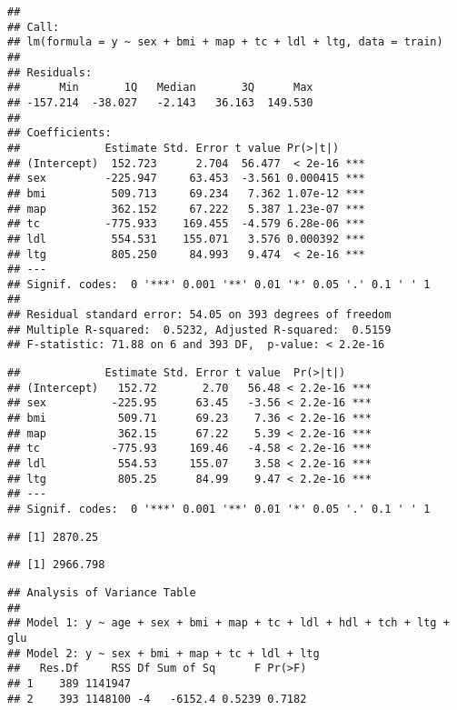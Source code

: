 \documentclass[
]{article}
\begin{document}
\begin{verbatim}
## 
## Call:
## lm(formula = y ~ sex + bmi + map + tc + ldl + ltg, data = train)
## 
## Residuals:
##      Min       1Q   Median       3Q      Max 
## -157.214  -38.027   -2.143   36.163  149.530 
## 
## Coefficients:
##             Estimate Std. Error t value Pr(>|t|)    
## (Intercept)  152.723      2.704  56.477  < 2e-16 ***
## sex         -225.947     63.453  -3.561 0.000415 ***
## bmi          509.713     69.234   7.362 1.07e-12 ***
## map          362.152     67.222   5.387 1.23e-07 ***
## tc          -775.933    169.455  -4.579 6.28e-06 ***
## ldl          554.531    155.071   3.576 0.000392 ***
## ltg          805.250     84.993   9.474  < 2e-16 ***
## ---
## Signif. codes:  0 '***' 0.001 '**' 0.01 '*' 0.05 '.' 0.1 ' ' 1
## 
## Residual standard error: 54.05 on 393 degrees of freedom
## Multiple R-squared:  0.5232, Adjusted R-squared:  0.5159 
## F-statistic: 71.88 on 6 and 393 DF,  p-value: < 2.2e-16
\end{verbatim}

\begin{verbatim}
##             Estimate Std. Error t value  Pr(>|t|)    
## (Intercept)   152.72       2.70   56.48 < 2.2e-16 ***
## sex          -225.95      63.45   -3.56 < 2.2e-16 ***
## bmi           509.71      69.23    7.36 < 2.2e-16 ***
## map           362.15      67.22    5.39 < 2.2e-16 ***
## tc           -775.93     169.46   -4.58 < 2.2e-16 ***
## ldl           554.53     155.07    3.58 < 2.2e-16 ***
## ltg           805.25      84.99    9.47 < 2.2e-16 ***
## ---
## Signif. codes:  0 '***' 0.001 '**' 0.01 '*' 0.05 '.' 0.1 ' ' 1
\end{verbatim}

\begin{verbatim}
## [1] 2870.25
\end{verbatim}

\begin{verbatim}
## [1] 2966.798
\end{verbatim}

\begin{verbatim}
## Analysis of Variance Table
## 
## Model 1: y ~ age + sex + bmi + map + tc + ldl + hdl + tch + ltg + glu
## Model 2: y ~ sex + bmi + map + tc + ldl + ltg
##   Res.Df     RSS Df Sum of Sq      F Pr(>F)
## 1    389 1141947                           
## 2    393 1148100 -4   -6152.4 0.5239 0.7182
\end{verbatim}
\end{document}
